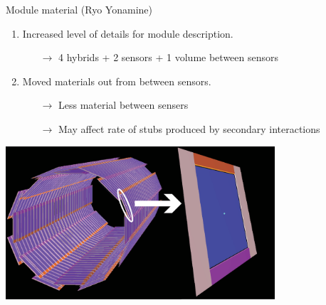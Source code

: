 \documentclass[pdftex, 11pt]{beamer}
\begin{document}
\begin{frame}{Module material \fontsize{7}{11}\selectfont (Ryo Yonamine)\normalsize}
\begin{enumerate}
  \item Increased level of \alert{details} for module description.
    \begin{itemize}
    \item [$\to$] \alert{4} hybrids + \alert{2} sensors + \alert{1} volume between sensors
    \end{itemize}
  \item \alert{Moved} materials out from between sensors.
    \begin{itemize}
        \item[$\to$] \alert{Less} material between sensers
        \item[$\to$] May affect rate of \alert{stubs} produced by secondary interactions
    \end{itemize}
\end{enumerate}
\begin{center}
  \includegraphics[width=10cm]{img/fireworks_display.eps}\\
\end{center}
\end{frame}
\end{document}
